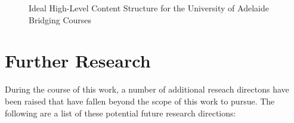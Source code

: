 \documentclass[twoside,12pt,a4paper]{report}
\begin{document}
\begin{figure}
\begin{center}
\end{center}
\caption{Ideal High-Level Content Structure for the University of Adelaide Bridging Courses \label{fig:contentStructure}}
\end{figure}






\section{Further Research}

During the course of this work, a number of additional reseach directons have been raised that have fallen beyond the scope of this work to pursue. The following are a list of these potential future research directions:
\end{document}
